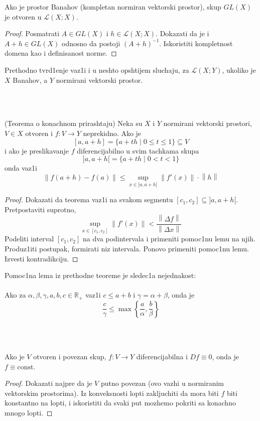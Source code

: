 \documentclass[a4paper,12pt]{article}
\newcommand{\R}{\mathbb{R}}
\newcommand{\psj}{\subseteq}
\newcommand{\norm}[1]{\left\lVert#1\right\rVert}
\begin{document}
\begin{tvr}
Ako je prostor Banahov (kompletan normiran vektorski prostor), skup $GL(X)$ je otvoren u $\mathcal{L}(X;X)$.
\end{tvr}
\begin{proof}
Posmatrati $A \in GL(X)$ i $h \in \mathcal{L} (X;X)$. Dokazati da je i $A+h \in GL(X)$ odnosno da postoji ${(A+h)}^{-1}$. Iskoristiti kompletnost domena kao i definisanost norme.
\end{proof}

\begin{nap}
Prethodno tvrd1enje vaz1i i u neshto opshtijem sluchaju, za $\mathcal{L}(X;Y)$, ukoliko je $X$ Banahov, a $Y$ normirani vektorski prostor.
\end{nap}
\\ \\
\begin{tma}
(Teorema o konachnom prirashtaju) Neka su $X$ i $Y$ normirani vektorski prostori, $V \in X$ otvoren i $f:V \to Y$ neprekidno. Ako je 
\[ [a, a+h] = \{a+th \mid 0 \leq t \leq 1\} \psj V \]
i ako je preslikavanje $f$ diferencijabilno u svim tachkama skupa 
\[]a, a+h[ = \{a+th \mid 0 < t < 1\}\]
onda vaz1i 
\[\norm{f(a+h) - f(a)} \leq \sup_{x \in ]a, a+h[} \norm{f'(x)} \cdot \norm{h}\]
\end{tma}
\begin{proof}
Dokazati da teorema vaz1i na svakom segmentu $[c_1, c_2] \psj ]a, a+h[$. Pretpostaviti suprotno, 
\[ \sup_{x \in [c_1, c_2]} \norm{f'(x)} < \frac{\norm{\Delta f}}{\norm{\Delta x}} \]
Podeliti interval $[c_1, c_2]$ na dva podintervala i primeniti pomoc1nu lemu na njih. Pro\-du\-z1i\-ti postupak, formirati niz intervala. Ponovo primeniti pomoc1nu lemu. Izvesti kon\-tra\-dik\-ci\-ju.
\end{proof}

\begin{nap}
Pomoc1na lema iz prethodne teoreme je sledec1a nejednakost: \\ \\
Ako za $\alpha, \beta, \gamma, a, b, c \in \R_+ $ vaz1i $c \leq a+b$ i $\gamma = \alpha + \beta$, onda je
\[\frac{c}{\gamma} \leq \max \left\{ \frac{a}{\alpha}, \frac{b}{\beta} \right\} \]
\end{nap}
\\ \\

\begin{posl}
	Ako je $V$ otvoren i povezan skup, $f:V \to Y$ diferencijabilna i $Df\equiv 0$, onda je $f \equiv \mathrm{const}$.
\end{posl}
\begin{proof}
	Dokazati najpre da je $V$ putno povezan (ovo vazhi u normiranim vektorskim prostorima). Iz konveksnosti lopti zakljuchiti da
	mora biti $f$ biti konstantno na lopti, i iskoristiti da svaki put mozhemo pokriti sa konachno mnogo lopti.
\end{proof}
\end{document}
